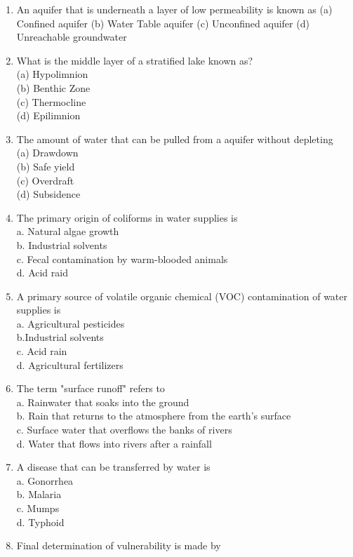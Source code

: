 \documentclass[10pt]{article}
\begin{document}
\begin{enumerate}
  \item An aquifer that is underneath a layer of low permeability is known as
(a) Confined aquifer
(b) Water Table aquifer
(c) Unconfined aquifer
(d) Unreachable groundwater

  \item What is the middle layer of a stratified lake known as?\\
(a) Hypolimnion\\
(b) Benthic Zone\\
(c) Thermocline\\
(d) Epilimnion\\

  \item The amount of water that can be pulled from a aquifer without depleting\\
(a) Drawdown\\
(b) Safe yield\\
(c) Overdraft\\
(d) Subsidence\\

  \item The primary origin of coliforms in water supplies is\\
a. Natural algae growth\\
b. Industrial solvents\\
c. Fecal contamination by warm-blooded animals\\
d. Acid raid\\

  \item A primary source of volatile organic chemical (VOC) contamination of water supplies is\\
a. Agricultural pesticides\\
b.Industrial solvents\\
c. Acid rain\\
d. Agricultural fertilizers\\

  \item The term "surface runoff" refers to\\
a. Rainwater that soaks into the ground\\
b. Rain that returns to the atmosphere from the earth's surface\\
c. Surface water that overflows the banks of rivers\\
d. Water that flows into rivers after a rainfall\\

  \item A disease that can be transferred by water is\\
a. Gonorrhea\\
b. Malaria\\
c. Mumps\\
d. Typhoid\\

  \item Final determination of vulnerability is made by

\end{enumerate}
\end{document}
